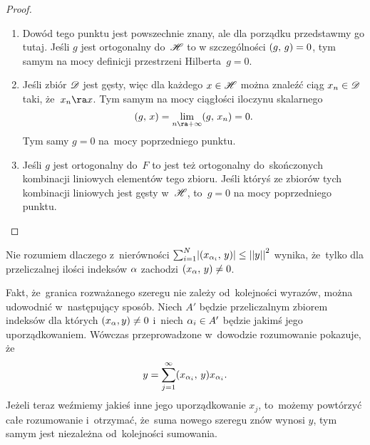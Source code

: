 \documentclass[a4paper,11pt]{article}
\begin{document}
\begin{proof}
  \begin{enumerate}
  \item Dowód tego punktu jest powszechnie znany, ale dla porządku
    przedstawmy go tutaj. Jeśli $g$ jest ortogonalny do~$\mathcal{H}$ to w
    szczególności $(  g , \,  g  ) = 0$, tym samym na mocy definicji
    przestrzeni Hilberta~$g = 0$.
  \item Jeśli zbiór $\mathcal{D}$ jest gęsty, więc dla każdego $x \in \mathcal{H}$
    można znaleźć ciąg $x_{ n } \in \mathcal{D}$ taki, że~$x_{ n } \ra x$. Tym
    samym na mocy ciągłości iloczynu skalarnego
    \begin{equation}
      \label{eq:5}
      \SP{ g }{ x } = \Lim_{ \nToInfty } \SP{ g }{ x_{ n } } = 0.
    \end{equation}
    Tym samy $g = 0$ na~mocy poprzedniego punktu.
  \item Jeśli $g$ jest ortogonalny do~$F$ to jest też ortogonalny
    do~skończonych kombinacji liniowych elementów tego zbioru. Jeśli
    któryś ze zbiorów tych kombinacji liniowych jest gęsty w~$\mathcal{H}$,
    to~$g = 0$ na mocy poprzedniego punktu.
  \end{enumerate}
\end{proof}

\vspace{\spaceFour}


\start {} Nie rozumiem dlaczego z~nierówności
$\sum_{ i = 1 }^{ N } \lvert  (  x_{ \alpha_{ i } } , \,  y  )  \rvert \leq \left|\left| 
  y  \right|\right|^{ 2 }$ wynika, że~tylko dla przeliczalnej ilości indeksów $\alpha$
zachodzi $(  x_{ \alpha } , \,  y  ) \neq 0$. \Dok

\vspace{\spaceFour}


\start {}  Fakt, że~granica
rozważanego szeregu nie zależy od~kolejności wyrazów, można udowodnić
w~następujący sposób. Niech $A'$ będzie przeliczalnym zbiorem indeksów
dla których $( x_{ \alpha }, y ) \neq 0$ i~niech $\alpha_{ i } \in A'$
będzie jakimś jego uporządkowaniem. Wówczas przeprowadzone w~dowodzie
rozumowanie pokazuje, że
\begin{equation}
  y = \sum\limits_{ j = 1 }^{ \infty } (  x_{ \alpha_{ i } } , \,  y  ) x_{ \alpha_{ i } }.
\end{equation}
Jeżeli teraz weźmiemy jakieś inne jego uporządkowanie $x_{ j }$,
to~możemy powtórzyć całe rozumowanie i~otrzymać, że~suma nowego
szeregu znów wynosi $y$, tym samym jest niezależna od~kolejności
sumowania.
\end{document}
